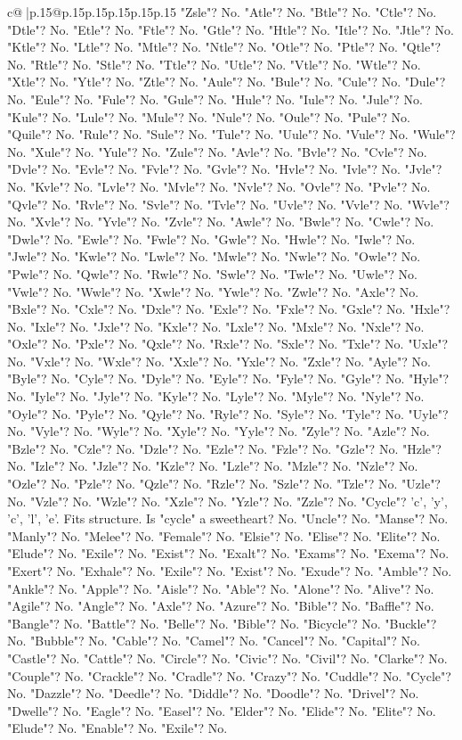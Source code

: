 \documentclass{article}
\begin{document}
{\begin{supertabular}{c@{$\;$}|p{.15\linewidth}@{}p{.15\linewidth}p{.15\linewidth}p{.15\linewidth}p{.15\linewidth}p{.15\linewidth}}
{{{"Zsle"? No. "Atle"? No. "Btle"? No. "Ctle"? No. "Dtle"? No. "Etle"? No. "Ftle"? No. "Gtle"? No. "Htle"? No. "Itle"? No. "Jtle"? No. "Ktle"? No. "Ltle"? No. "Mtle"? No. "Ntle"? No. "Otle"? No. "Ptle"? No. "Qtle"? No. "Rtle"? No. "Stle"? No. "Ttle"? No. "Utle"? No. "Vtle"? No. "Wtle"? No. "Xtle"? No. "Ytle"? No. "Ztle"? No. "Aule"? No. "Bule"? No. "Cule"? No. "Dule"? No. "Eule"? No. "Fule"? No. "Gule"? No. "Hule"? No. "Iule"? No. "Jule"? No. "Kule"? No. "Lule"? No. "Mule"? No. "Nule"? No. "Oule"? No. "Pule"? No. "Quile"? No. "Rule"? No. "Sule"? No. "Tule"? No. "Uule"? No. "Vule"? No. "Wule"? No. "Xule"? No. "Yule"? No. "Zule"? No. "Avle"? No. "Bvle"? No. "Cvle"? No. "Dvle"? No. "Evle"? No. "Fvle"? No. "Gvle"? No. "Hvle"? No. "Ivle"? No. "Jvle"? No. "Kvle"? No. "Lvle"? No. "Mvle"? No. "Nvle"? No. "Ovle"? No. "Pvle"? No. "Qvle"? No. "Rvle"? No. "Svle"? No. "Tvle"? No. "Uvle"? No. "Vvle"? No. "Wvle"? No. "Xvle"? No. "Yvle"? No. "Zvle"? No. "Awle"? No. "Bwle"? No. "Cwle"? No. "Dwle"? No. "Ewle"? No. "Fwle"? No. "Gwle"? No. "Hwle"? No. "Iwle"? No. "Jwle"? No. "Kwle"? No. "Lwle"? No. "Mwle"? No. "Nwle"? No. "Owle"? No. "Pwle"? No. "Qwle"? No. "Rwle"? No. "Swle"? No. "Twle"? No. "Uwle"? No. "Vwle"? No. "Wwle"? No. "Xwle"? No. "Ywle"? No. "Zwle"? No. "Axle"? No. "Bxle"? No. "Cxle"? No. "Dxle"? No. "Exle"? No. "Fxle"? No. "Gxle"? No. "Hxle"? No. "Ixle"? No. "Jxle"? No. "Kxle"? No. "Lxle"? No. "Mxle"? No. "Nxle"? No. "Oxle"? No. "Pxle"? No. "Qxle"? No. "Rxle"? No. "Sxle"? No. "Txle"? No. "Uxle"? No. "Vxle"? No. "Wxle"? No. "Xxle"? No. "Yxle"? No. "Zxle"? No. "Ayle"? No. "Byle"? No. "Cyle"? No. "Dyle"? No. "Eyle"? No. "Fyle"? No. "Gyle"? No. "Hyle"? No. "Iyle"? No. "Jyle"? No. "Kyle"? No. "Lyle"? No. "Myle"? No. "Nyle"? No. "Oyle"? No. "Pyle"? No. "Qyle"? No. "Ryle"? No. "Syle"? No. "Tyle"? No. "Uyle"? No. "Vyle"? No. "Wyle"? No. "Xyle"? No. "Yyle"? No. "Zyle"? No. "Azle"? No. "Bzle"? No. "Czle"? No. "Dzle"? No. "Ezle"? No. "Fzle"? No. "Gzle"? No. "Hzle"? No. "Izle"? No. "Jzle"? No. "Kzle"? No. "Lzle"? No. "Mzle"? No. "Nzle"? No. "Ozle"? No. "Pzle"? No. "Qzle"? No. "Rzle"? No. "Szle"? No. "Tzle"? No. "Uzle"? No. "Vzle"? No. "Wzle"? No. "Xzle"? No. "Yzle"? No. "Zzle"? No. "Cycle"? 'c', 'y', 'c', 'l', 'e'. Fits structure. Is "cycle" a sweetheart? No. "Uncle"? No. "Manse"? No. "Manly"? No. "Melee"? No. "Female"? No. "Elsie"? No. "Elise"? No. "Elite"? No. "Elude"? No. "Exile"? No. "Exist"? No. "Exalt"? No. "Exams"? No. "Exema"? No. "Exert"? No. "Exhale"? No. "Exile"? No. "Exist"? No. "Exude"? No. "Amble"? No. "Ankle"? No. "Apple"? No. "Aisle"? No. "Able"? No. "Alone"? No. "Alive"? No. "Agile"? No. "Angle"? No. "Axle"? No. "Azure"? No. "Bible"? No. "Baffle"? No. "Bangle"? No. "Battle"? No. "Belle"? No. "Bible"? No. "Bicycle"? No. "Buckle"? No. "Bubble"? No. "Cable"? No. "Camel"? No. "Cancel"? No. "Capital"? No. "Castle"? No. "Cattle"? No. "Circle"? No. "Civic"? No. "Civil"? No. "Clarke"? No. "Couple"? No. "Crackle"? No. "Cradle"? No. "Crazy"? No. "Cuddle"? No. "Cycle"? No. "Dazzle"? No. "Deedle"? No. "Diddle"? No. "Doodle"? No. "Drivel"? No. "Dwelle"? No. "Eagle"? No. "Easel"? No. "Elder"? No. "Elide"? No. "Elite"? No. "Elude"? No. "Enable"? No. "Exile"? No. }}}
\end{supertabular}}
\end{document}

